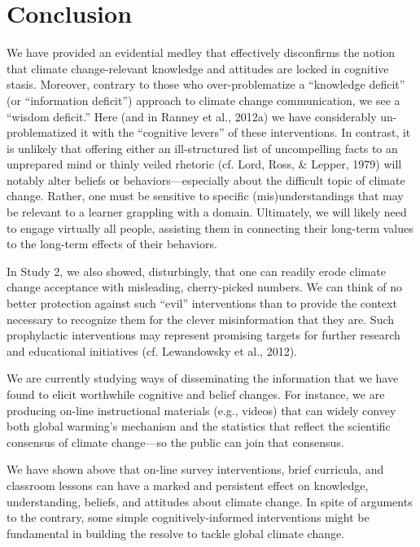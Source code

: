\graphicspath{{conclusion/}}

\chapter{Conclusion}
\label{chap:conclusion}

We have provided an evidential medley that effectively disconfirms the notion
that climate change-relevant knowledge and attitudes are locked in cognitive
stasis. Moreover, contrary to those who over-problematize a ``knowledge deficit''
(or ``information deficit'') approach to climate change communication, we see a
``wisdom deficit.'' Here (and in Ranney et al., 2012a) we have considerably
un-problematized it with the ``cognitive levers'' of these interventions. In
contrast, it is unlikely that offering either an ill-structured list of
uncompelling facts to an unprepared mind or thinly veiled rhetoric (cf. Lord,
Ross, \& Lepper, 1979) will notably alter beliefs or behaviors––especially about
the difficult topic of climate change. Rather, one must be sensitive to specific
(mis)understandings that may be relevant to a learner grappling with a domain.
Ultimately, we will likely need to engage virtually all people, assisting them
in connecting their long-term values to the long-term effects of their
behaviors.

In Study 2, we also showed, disturbingly, that one can readily erode climate
change acceptance with misleading, cherry-picked numbers. We can think of no
better protection against such ``evil'' interventions than to provide the context
necessary to recognize them for the clever misinformation that they are. Such
prophylactic interventions may represent promising targets for further research
and educational initiatives (cf. Lewandowsky et al., 2012).

We are currently studying ways of disseminating the information that we have
found to elicit worthwhile cognitive and belief changes.  For instance, we are
producing on-line instructional materials (e.g., videos) that can widely convey
both global warming’s mechanism and the statistics that reflect the scientific
consensus of climate change—so the public can join that consensus.

We have shown above that on-line survey interventions, brief curricula, and
classroom lessons can have a marked and persistent effect on knowledge,
understanding, beliefs, and attitudes about climate change. In spite of
arguments to the contrary, some simple cognitively-informed interventions might
be fundamental in building the resolve to tackle global climate change.

